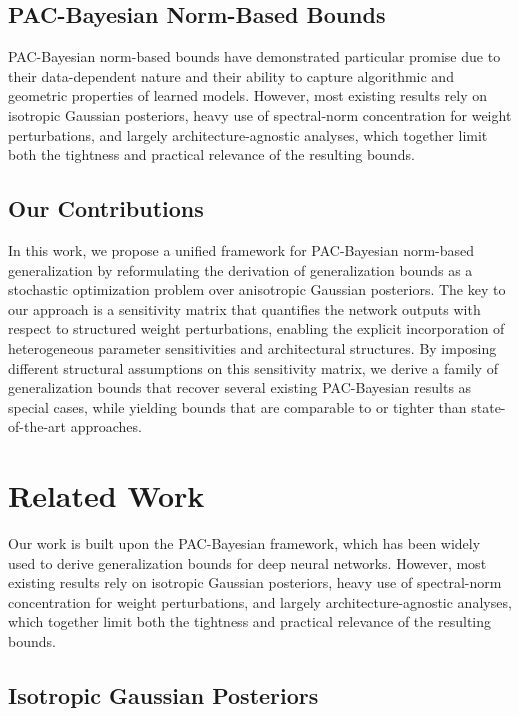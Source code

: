 \documentclass{article}
\begin{document}
\subsection{PAC-Bayesian Norm-Based Bounds}

PAC-Bayesian norm-based bounds have demonstrated particular promise due to their data-dependent nature and their ability to capture algorithmic and geometric properties of learned models. However, most existing results rely on isotropic Gaussian posteriors, heavy use of spectral-norm concentration for weight perturbations, and largely architecture-agnostic analyses, which together limit both the tightness and practical relevance of the resulting bounds.

\subsection{Our Contributions}

In this work, we propose a unified framework for PAC-Bayesian norm-based generalization by reformulating the derivation of generalization bounds as a stochastic optimization problem over anisotropic Gaussian posteriors. The key to our approach is a sensitivity matrix that quantifies the network outputs with respect to structured weight perturbations, enabling the explicit incorporation of heterogeneous parameter sensitivities and architectural structures. By imposing different structural assumptions on this sensitivity matrix, we derive a family of generalization bounds that recover several existing PAC-Bayesian results as special cases, while yielding bounds that are comparable to or tighter than state-of-the-art approaches.

\section{Related Work}

Our work is built upon the PAC-Bayesian framework, which has been widely used to derive generalization bounds for deep neural networks. However, most existing results rely on isotropic Gaussian posteriors, heavy use of spectral-norm concentration for weight perturbations, and largely architecture-agnostic analyses, which together limit both the tightness and practical relevance of the resulting bounds.

\subsection{Isotropic Gaussian Posteriors}
\end{document}

